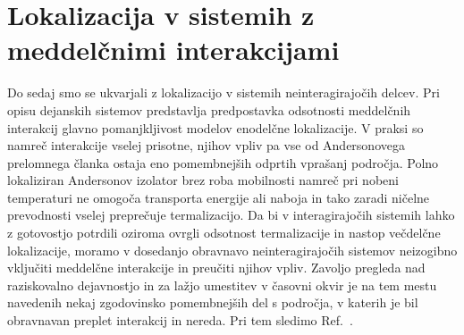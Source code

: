 \section{Lokalizacija v sistemih z meddelčnimi interakcijami}
\label{lokalizacija_v_sistemih_z_med}
Do sedaj smo se ukvarjali z lokalizacijo v sistemih neinteragirajočih delcev. Pri opisu dejanskih sistemov predstavlja predpostavka odsotnosti meddelčnih interakcij glavno pomanjkljivost modelov enodelčne lokalizacije. V praksi so namreč interakcije vselej prisotne, njihov vpliv pa vse od Andersonovega prelomnega članka ostaja eno pomembnejših odprtih vprašanj področja. Polno lokaliziran Andersonov izolator brez roba mobilnosti namreč pri nobeni temperaturi ne omogoča transporta energije ali naboja in tako zaradi ničelne prevodnosti vselej preprečuje termalizacijo. Da bi v interagirajočih sistemih lahko z gotovostjo potrdili oziroma ovrgli odsotnost termalizacije in nastop večdelčne lokalizacije, moramo v dosedanjo obravnavo neinteragirajočih sistemov neizogibno vključiti meddelčne interakcije in preučiti njihov vpliv. Zavoljo pregleda nad raziskovalno dejavnostjo in za lažjo umestitev v časovni okvir je na tem mestu navedenih nekaj zgodovinsko pomembnejših del s področja, v katerih je bil obravnavan preplet interakcij in nereda. Pri tem sledimo Ref.~\cite{abanin2018ergodicity}.\\\\
